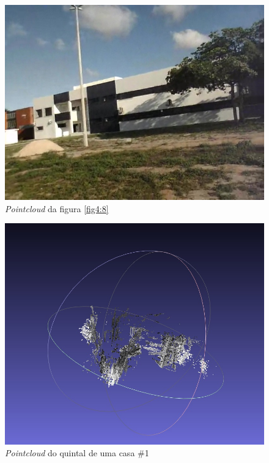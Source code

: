 \begin{figure}[!htb]
	\centering
		\includegraphics[width= \textwidth]{Imagens/figura4-9.jpg}
	\caption{\textit{Pointcloud} da figura \ref{fig4:8}}
	\label{fig4:9}
\end{figure}

\begin{figure}[!htb]
	\centering
		\includegraphics[width= \textwidth]{Imagens/figura4-10.jpg}
	\caption{\textit{Pointcloud} do quintal de uma casa \#1}
	\label{fig4:10}
\end{figure}

